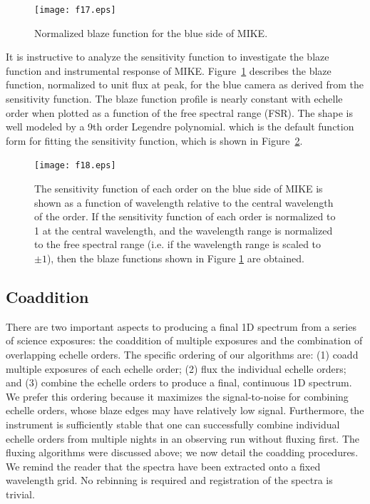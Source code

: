 \documentclass[]{emulateapj}
\begin{document}
\begin{figure}
\texttt{[image: f17.eps]}
\caption{Normalized blaze function for the blue side of MIKE.
}
\label{fig:blaze}
\end{figure}


It is instructive to analyze the sensitivity function to 
investigate the blaze function and instrumental response
of MIKE.  Figure~\ref{fig:blaze} describes the blaze function,
normalized to unit flux at peak, for the blue camera as
derived from the sensitivity function.  The blaze function
profile is nearly constant with echelle order when plotted
as a function of the free spectral range (FSR).  The shape
is well modeled by a 9th order Legendre polynomial.
which is the default function form for fitting the sensitivity
function, which is shown in Figure~\ref{fig:sensitivity}.




\begin{figure}
\texttt{[image: f18.eps]}
\caption{The sensitivity function of each order on the blue side of
    MIKE is shown as a function of wavelength relative to the central
    wavelength of the order.  If the sensitivity function of each
    order is normalized to 1 at the central wavelength, and the
    wavelength range is normalized to the free spectral range (i.e. if
    the wavelength range is scaled to ${\pm 1}$), then the blaze
    functions shown in Figure \ref{fig:blaze} are obtained.
    }
\label{fig:sensitivity}
\end{figure}

\subsection{Coaddition}

There are two important aspects to producing a final 1D
spectrum from a series of science exposures:
the coaddition of multiple exposures and the combination
of overlapping echelle orders.
The specific ordering of our algorithms are:
(1) coadd multiple exposures of each echelle order;
(2) flux the individual echelle orders;
and (3) combine the echelle orders to produce a final, continuous
1D spectrum.
We prefer this ordering because it maximizes the signal-to-noise 
for combining echelle orders, whose blaze edges may have relatively
low signal.
Furthermore, the instrument is sufficiently
stable that one can successfully combine individual echelle
orders from multiple nights in an observing run without fluxing first.
The fluxing algorithms were discussed above;
we now detail the coadding procedures.
We remind the reader that the spectra have been extracted onto
a fixed wavelength grid.  No rebinning is required and registration
of the spectra is trivial.
\end{document}
